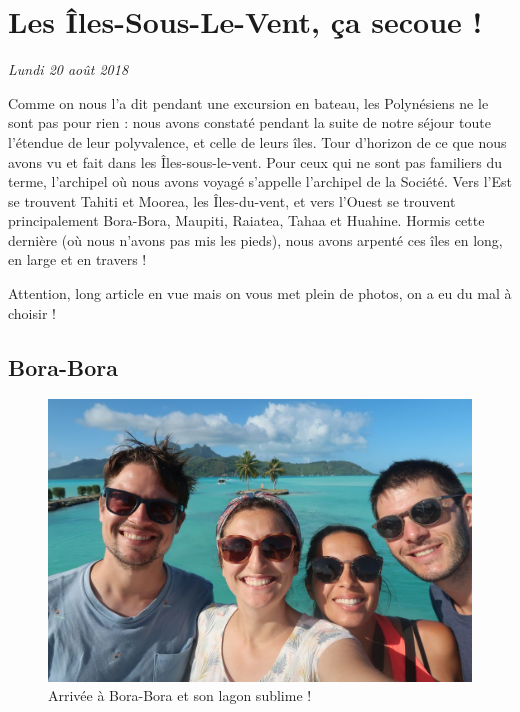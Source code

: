 \hypertarget{les-uxeeles-sous-le-vent-uxe7a-secoue}{%
\section{Les Îles-Sous-Le-Vent, ça secoue
!}\label{les-uxeeles-sous-le-vent-uxe7a-secoue}}

\emph{Lundi 20 août 2018}

Comme on nous l'a dit pendant une excursion en bateau, les Polynésiens
ne le sont pas pour rien : nous avons constaté pendant la suite de notre
séjour toute l'étendue de leur polyvalence, et celle de leurs îles. Tour
d'horizon de ce que nous avons vu et fait dans les Îles-sous-le-vent.
Pour ceux qui ne sont pas familiers du terme, l'archipel où nous avons
voyagé s'appelle l'archipel de la Société. Vers l'Est se trouvent Tahiti
et Moorea, les Îles-du-vent, et vers l'Ouest se trouvent principalement
Bora-Bora, Maupiti, Raiatea, Tahaa et Huahine. Hormis cette dernière (où
nous n'avons pas mis les pieds), nous avons arpenté ces îles en long, en
large et en travers !

\hypertarget{mapid}{}

Attention, long article en vue mais on vous met plein de photos, on a eu
du mal à choisir !

\hypertarget{bora-bora}{%
\subsection{Bora-Bora}\label{bora-bora}}

\begin{figure}
\centering
\includegraphics{images/20180820_boraselfie.JPG}
\caption{Arrivée à Bora-Bora et son lagon sublime !}
\end{figure}

